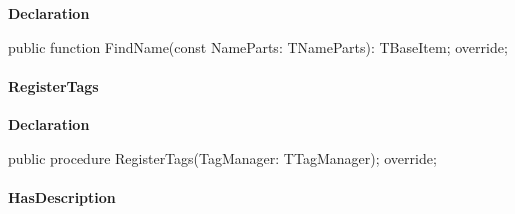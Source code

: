 \documentclass{report}
\newif\ifpdf
\begin{document}
\label{PasDoc_Items.TPasItem-FindName}
\begin{list}{}{
\setlength{\itemindent}{0cm}
\setlength{\listparindent}{0cm}
\setlength{\leftmargin}{\evensidemargin}
\addtolength{\leftmargin}{\tmplength}
\settowidth{\labelsep}{X}
\addtolength{\leftmargin}{\labelsep}
\setlength{\labelwidth}{\tmplength}
}
\item[\textbf{Declaration}\hfill]
\ifpdf
\begin{flushleft}
\fi
\begin{ttfamily}
public function FindName(const NameParts: TNameParts): TBaseItem; override;\end{ttfamily}

\ifpdf
\end{flushleft}
\fi

\end{list}
\paragraph*{RegisterTags}\hspace*{\fill}

\label{PasDoc_Items.TPasItem-RegisterTags}
\begin{list}{}{
\setlength{\itemindent}{0cm}
\setlength{\listparindent}{0cm}
\setlength{\leftmargin}{\evensidemargin}
\addtolength{\leftmargin}{\tmplength}
\settowidth{\labelsep}{X}
\addtolength{\leftmargin}{\labelsep}
\setlength{\labelwidth}{\tmplength}
}
\item[\textbf{Declaration}\hfill]
\ifpdf
\begin{flushleft}
\fi
\begin{ttfamily}
public procedure RegisterTags(TagManager: TTagManager); override;\end{ttfamily}

\ifpdf
\end{flushleft}
\fi

\end{list}
\paragraph*{HasDescription}\hspace*{\fill}
\end{document}

